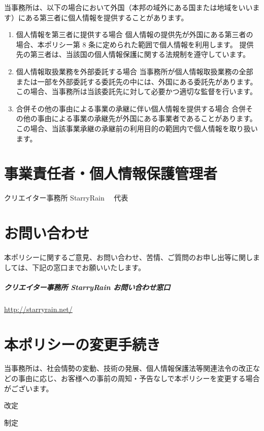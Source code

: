 \documentclass[a4j,titlepage]{ltjsarticle}
\begin{document}
当事務所は、以下の場合において外国（本邦の域外にある国または地域をいいます）にある第三者に個人情報を提供することがあります。
\begin{enumerate}[(1)]
	\item 個人情報を第三者に提供する場合
	      個人情報の提供先が外国にある第三者の場合、本ポリシー第 8 条に定められた範囲で個人情報を利用します。
	      提供先の第三者は、当該国の個人情報保護に関する法規制を遵守しています。
	\item 個人情報取扱業務を外部委託する場合
	      当事務所が個人情報取扱業務の全部または一部を外部委託する委託先の中には、外国にある委託先があります。この場合、当事務所は当該委託先に対して必要かつ適切な監督を行います。
	\item 合併その他の事由による事業の承継に伴い個人情報を提供する場合
	      合併その他の事由による事業の承継先が外国にある事業者であることがあります。この場合、当該事業承継の承継前の利用目的の範囲内で個人情報を取り扱います。
\end{enumerate}


\section{事業責任者・個人情報保護管理者}
クリエイター事務所 StarryRain 　代表

\section{お問い合わせ}
本ポリシーに関するご意見、お問い合わせ、苦情、ご質問のお申し出等に関しましては、下記の窓口までお願いいたします。
\subparagraph{クリエイター事務所 StarryRain お問い合わせ窓口}
\url{http://starryrain.net/}


\section{本ポリシーの変更手続き}
当事務所は、社会情勢の変動、技術の発展、個人情報保護法等関連法令の改正などの事由に応じ、お客様への事前の周知・予告なしで本ポリシーを変更する場合がございます。

\begin{flushright}
	\par \date{\Filemodtoday{\jobname}} 改定
	\par\date{2021年11月27日} 制定
\end{flushright}
\end{document}
